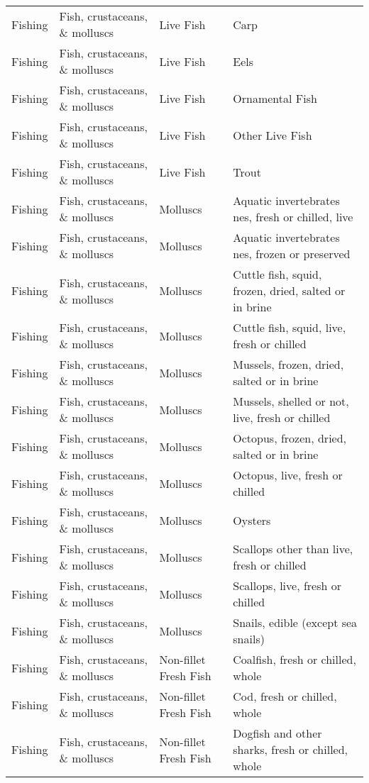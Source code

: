 \begin{appendices}
\begin{xltabular}{\textwidth}{|p{0.10\textwidth}|p{0.27\textwidth}|p{0.25\textwidth}|p{0.26\textwidth}|}
Fishing & Fish, crustaceans, \& molluscs & Live Fish & Carp \\
Fishing & Fish, crustaceans, \& molluscs & Live Fish & Eels \\
Fishing & Fish, crustaceans, \& molluscs & Live Fish & Ornamental Fish \\
Fishing & Fish, crustaceans, \& molluscs & Live Fish & Other Live Fish \\
Fishing & Fish, crustaceans, \& molluscs & Live Fish & Trout \\
Fishing & Fish, crustaceans, \& molluscs & Molluscs & Aquatic invertebrates nes, fresh or chilled, live \\
Fishing & Fish, crustaceans, \& molluscs & Molluscs & Aquatic invertebrates nes, frozen or preserved \\
Fishing & Fish, crustaceans, \& molluscs & Molluscs & Cuttle fish, squid, frozen, dried, salted or in brine \\
Fishing & Fish, crustaceans, \& molluscs & Molluscs & Cuttle fish, squid, live, fresh or chilled \\
Fishing & Fish, crustaceans, \& molluscs & Molluscs & Mussels, frozen, dried, salted or in brine \\
Fishing & Fish, crustaceans, \& molluscs & Molluscs & Mussels, shelled or not, live, fresh or chilled \\
Fishing & Fish, crustaceans, \& molluscs & Molluscs & Octopus, frozen, dried, salted or in brine \\
Fishing & Fish, crustaceans, \& molluscs & Molluscs & Octopus, live, fresh or chilled \\
Fishing & Fish, crustaceans, \& molluscs & Molluscs & Oysters \\
Fishing & Fish, crustaceans, \& molluscs & Molluscs & Scallops other than live, fresh or chilled \\
Fishing & Fish, crustaceans, \& molluscs & Molluscs & Scallops, live, fresh or chilled \\
Fishing & Fish, crustaceans, \& molluscs & Molluscs & Snails, edible (except sea snails) \\
Fishing & Fish, crustaceans, \& molluscs & Non-fillet Fresh Fish & Coalfish, fresh or chilled, whole \\
Fishing & Fish, crustaceans, \& molluscs & Non-fillet Fresh Fish & Cod, fresh or chilled, whole \\
Fishing & Fish, crustaceans, \& molluscs & Non-fillet Fresh Fish & Dogfish and other sharks, fresh or chilled, whole \\

\end{xltabular}
\end{appendices}
